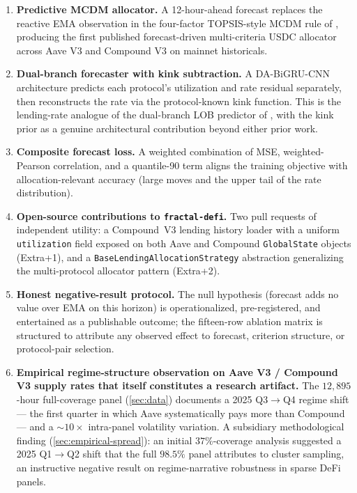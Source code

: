 \documentclass[11pt,a4paper]{article}
\begin{document}
\begin{enumerate}[leftmargin=*, itemsep=2pt]
\item \textbf{Predictive MCDM allocator.} A 12-hour-ahead forecast
  replaces the reactive EMA observation in the four-factor TOPSIS-style
  MCDM rule of \cite{solovev2026vault}, producing the first published
  forecast-driven multi-criteria USDC allocator across Aave V3 and
  Compound V3 on mainnet historicals.
\item \textbf{Dual-branch forecaster with kink subtraction.} A
  DA-BiGRU-CNN architecture predicts each protocol's utilization and
  rate residual separately, then reconstructs the rate via the
  protocol-known kink function. This is the lending-rate analogue of
  the dual-branch LOB predictor of \cite{solovev2026lob}, with the
  kink prior as a genuine architectural contribution beyond either
  prior work.
\item \textbf{Composite forecast loss.} A weighted combination of
  MSE, weighted-Pearson correlation, and a quantile-90 term aligns the
  training objective with allocation-relevant accuracy (large moves and
  the upper tail of the rate distribution).
\item \textbf{Open-source contributions to \texttt{fractal-defi}.}
  Two pull requests of independent utility: a Compound~V3 lending
  history loader with a uniform \texttt{utilization} field exposed on
  both Aave and Compound \texttt{GlobalState} objects (Extra+1), and a
  \texttt{BaseLendingAllocationStrategy} abstraction generalizing the
  multi-protocol allocator pattern (Extra+2).
\item \textbf{Honest negative-result protocol.} The null hypothesis
  (forecast adds no value over EMA on this horizon) is operationalized,
  pre-registered, and entertained as a publishable outcome; the
  fifteen-row ablation matrix is structured to attribute any observed
  effect to forecast, criterion structure, or protocol-pair selection.
\item \textbf{Empirical regime-structure observation on Aave V3 /
  Compound V3 supply rates that itself constitutes a research artifact.}
  The $12{,}895$-hour full-coverage panel (\cref{sec:data}) documents
  a 2025 Q3$\to$Q4 regime shift --- the first quarter in which Aave
  systematically pays more than Compound --- and a $\sim$$10\times$
  intra-panel volatility variation. A subsidiary methodological
  finding (\cref{sec:empirical-spread}): an initial $37\%$-coverage
  analysis suggested a 2025 Q1$\to$Q2 shift that the full $98.5\%$
  panel attributes to cluster sampling, an instructive negative
  result on regime-narrative robustness in sparse DeFi panels.
\end{enumerate}
\end{document}

